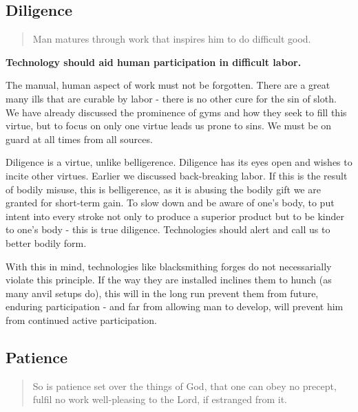 \documentclass[letterpaper]{article}
\begin{document}


\subsection{Diligence}

\begin{quote}
  Man matures through work that inspires him to do difficult good.
\end{quote}

\textbf{Technology should aid human participation in difficult labor.}

The manual, human aspect of work must not be forgotten. There are a great many ills that are curable by labor - there is no other cure for the sin of sloth. We have already discussed the prominence of gyms and how they seek to fill this virtue, but to focus on only one virtue leads us prone to sins. We must be on guard at all times from all sources.

Diligence is a virtue, unlike belligerence. Diligence has its eyes open and wishes to incite other virtues. Earlier we discussed back-breaking labor. If this is the result of bodily misuse, this is belligerence, as it is abusing the bodily gift we are granted for short-term gain. To slow down and be aware of one's body, to put intent into every stroke not only to produce a superior product but to be kinder to one's body - this is true diligence. Technologies should alert and call us to better bodily form.

With this in mind, technologies like blacksmithing forges do not necessarially violate this principle. If the way they are installed inclines them to hunch (as many anvil setups do), this will in the long run prevent them from future, enduring participation - and far from allowing man to develop, will prevent him from continued active participation.

\subsection{Patience}

\begin{quote}
  So is patience set over the things of God, that one can obey no precept, fulfil no work well-pleasing to the Lord, if estranged from it.
\end{quote}
\end{document}
